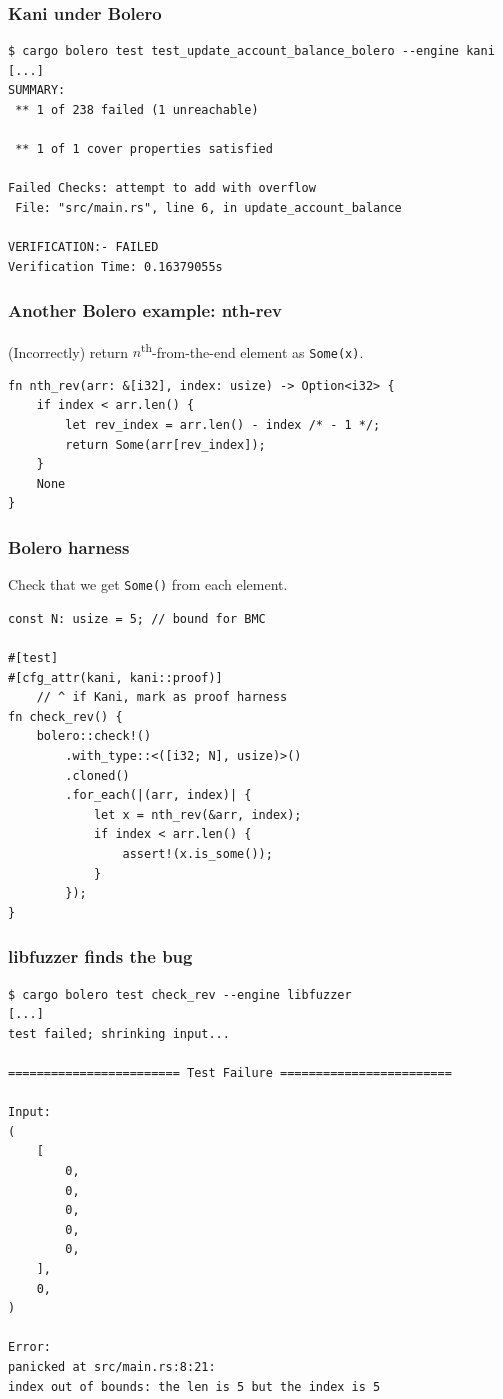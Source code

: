 \documentclass{beamer}
\newenvironment{changemargin}[1]{%
  \begin{list}{}{%
    \setlength{\topsep}{0pt}%
    \setlength{\leftmargin}{#1}%
    \setlength{\rightmargin}{1em}
    \setlength{\listparindent}{\parindent}%
    \setlength{\itemindent}{\parindent}%
    \setlength{\parsep}{\parskip}%
  }%
  \item[]}{\end{list}}
\begin{document}
\begin{frame}[fragile]
  \frametitle{Kani under Bolero}
  \scriptsize
\begin{verbatim}
$ cargo bolero test test_update_account_balance_bolero --engine kani
[...]
SUMMARY:
 ** 1 of 238 failed (1 unreachable)

 ** 1 of 1 cover properties satisfied

Failed Checks: attempt to add with overflow
 File: "src/main.rs", line 6, in update_account_balance

VERIFICATION:- FAILED
Verification Time: 0.16379055s
\end{verbatim}
\end{frame}

\begin{frame}[fragile]
  \frametitle{Another Bolero example: nth-rev}
  \begin{changemargin}{1cm}
    (Incorrectly) return $n$\textsuperscript{th}-from-the-end element as \texttt{Some(x)}.
  \end{changemargin}
\small \begin{lstlisting}
fn nth_rev(arr: &[i32], index: usize) -> Option<i32> {
    if index < arr.len() {
        let rev_index = arr.len() - index /* - 1 */;
        return Some(arr[rev_index]);
    }
    None
}
\end{lstlisting}
\end{frame}

\begin{frame}[fragile]
  \frametitle{Bolero harness}
  \begin{changemargin}{1cm}
{\Large    Check that we get \texttt{Some()} from each element.}
  \end{changemargin}
  \small
\begin{lstlisting}
const N: usize = 5; // bound for BMC

#[test]
#[cfg_attr(kani, kani::proof)]
    // ^ if Kani, mark as proof harness
fn check_rev() {
    bolero::check!()
        .with_type::<([i32; N], usize)>()
        .cloned()
        .for_each(|(arr, index)| {
            let x = nth_rev(&arr, index);
            if index < arr.len() {
                assert!(x.is_some());
            }
        });
}
\end{lstlisting}
\end{frame}

\begin{frame}[fragile]
  \frametitle{libfuzzer finds the bug}
  \begin{changemargin}{1cm}
\scriptsize \begin{verbatim}
$ cargo bolero test check_rev --engine libfuzzer
[...]
test failed; shrinking input...

======================== Test Failure ========================

Input: 
(
    [
        0,
        0,
        0,
        0,
        0,
    ],
    0,
)

Error: 
panicked at src/main.rs:8:21:
index out of bounds: the len is 5 but the index is 5
\end{verbatim}
  \end{changemargin}
\end{frame}
\end{document}
